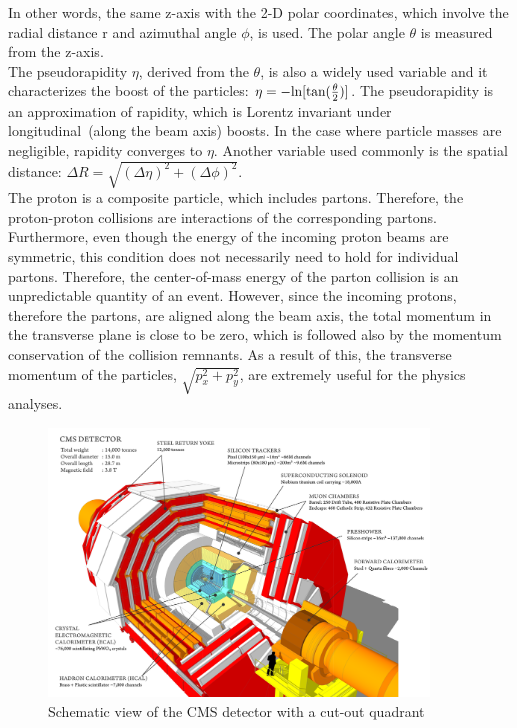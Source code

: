 In other words, the same z-axis with the 2-D polar coordinates, which involve the radial distance r and azimuthal angle $\phi$, is used. The polar angle $\theta$ is measured from the z-axis.\\
The pseudorapidity $\eta$, derived from the $\theta$, is also a widely used variable and it characterizes the boost of the particles: $\eta= {\rm -ln[tan(\frac{\theta}{2})]}$. The pseudorapidity is an approximation of rapidity, which is Lorentz invariant under longitudinal~(along the beam axis) boosts. In the case where particle masses are negligible, rapidity converges to $\eta$. Another variable used commonly is the spatial distance: $\Delta R = \sqrt{(\Delta\eta)^2+(\Delta\phi)^2}$.\\
The proton is a composite particle, which includes partons. Therefore, the proton-proton collisions are interactions of the corresponding partons. Furthermore, even though the energy of the incoming proton beams are symmetric, this condition does not necessarily need to hold for individual partons. Therefore, the center-of-mass energy of the parton collision is an unpredictable quantity of an event. However, since the incoming protons, therefore the partons, are aligned along the beam axis, the total momentum in the transverse
plane is close to be zero, which is followed also by the momentum conservation of the collision remnants. As a result of this, the transverse momentum of the particles, $\sqrt{p^2_x+p^2_y}$, are extremely useful for the physics analyses.
\begin{figure}
\begin{center}
\includegraphics[width=0.9\textwidth]{Plots/CMS/CMS.jpg}
\caption{\label{fig:CMS} Schematic view of the CMS detector with a cut-out quadrant~\cite{CMS_Vis}}
\end{center}
\end{figure}
